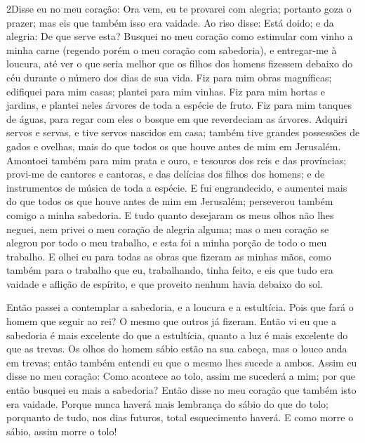\lettrine{2} Disse eu no meu coração: Ora vem, eu te provarei
com alegria; portanto goza o prazer; mas eis que também isso era
vaidade. Ao riso disse: Está doido; e da alegria: De que serve
esta? Busquei no meu coração como estimular com vinho a minha
carne (regendo porém o meu coração com sabedoria), e entregar-me à
loucura, até ver o que seria melhor que os filhos dos homens
fizessem debaixo do céu durante o número dos dias de sua vida.
Fiz para mim obras magníficas; edifiquei para mim casas; plantei
para mim vinhas. Fiz para mim hortas e jardins, e plantei neles
árvores de toda a espécie de fruto. Fiz para mim tanques de
águas, para regar com eles o bosque em que reverdeciam as árvores.
Adquiri servos e servas, e tive servos nascidos em casa; também
tive grandes possessões de gados e ovelhas, mais do que todos os que
houve antes de mim em Jerusalém. Amontoei também para mim prata
e ouro, e tesouros dos reis e das províncias; provi-me de cantores e
cantoras, e das delícias dos filhos dos homens; e de instrumentos de
música de toda a espécie. E fui engrandecido, e aumentei mais do
que todos os que houve antes de mim em Jerusalém; perseverou também
comigo a minha sabedoria. E tudo quanto desejaram os meus
olhos não lhes neguei, nem privei o meu coração de alegria alguma;
mas o meu coração se alegrou por todo o meu trabalho, e esta foi a
minha porção de todo o meu trabalho. E olhei eu para todas as
obras que fizeram as minhas mãos, como também para o trabalho que
eu, trabalhando, tinha feito, e eis que tudo era vaidade e aflição
de espírito, e que proveito nenhum havia debaixo do sol.

Então passei a contemplar a sabedoria, e a loucura e a
estultícia. Pois que fará o homem que seguir ao rei? O mesmo que
outros já fizeram. Então vi eu que a sabedoria é mais
excelente do que a estultícia, quanto a luz é mais excelente do que
as trevas. Os olhos do homem sábio estão na sua cabeça, mas o
louco anda em trevas; então também entendi eu que o mesmo lhes
sucede a ambos. Assim eu disse no meu coração: Como acontece
ao tolo, assim me sucederá a mim; por que então busquei eu mais a
sabedoria? Então disse no meu coração que também isto era vaidade.
Porque nunca haverá mais lembrança do sábio do que do tolo;
porquanto de tudo, nos dias futuros, total esquecimento haverá. E
como morre o sábio, assim morre o tolo!


